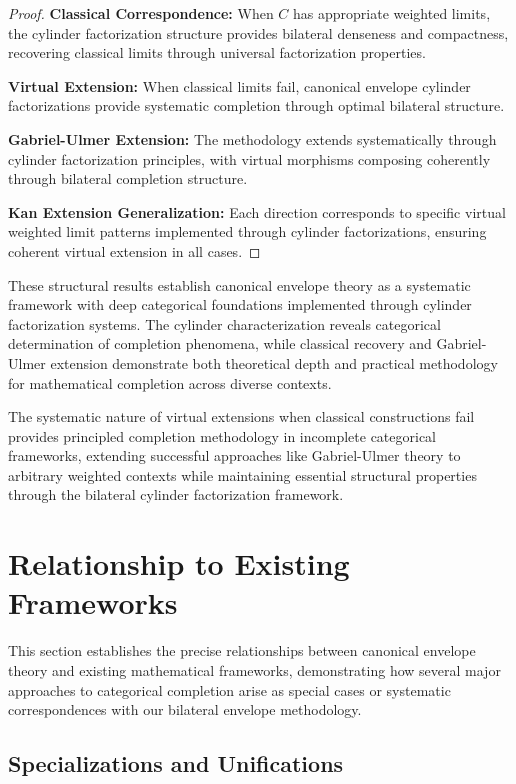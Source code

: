 \documentclass[11pt]{article}
\theoremstyle{plain}
\theoremstyle{definition}
\theoremstyle{remark}
\begin{document}
\begin{proof}
\textbf{Classical Correspondence:} When $C$ has appropriate weighted limits, the cylinder factorization structure provides bilateral denseness and compactness, recovering classical limits through universal factorization properties.

\textbf{Virtual Extension:} When classical limits fail, canonical envelope cylinder factorizations provide systematic completion through optimal bilateral structure.

\textbf{Gabriel-Ulmer Extension:} The methodology extends systematically through cylinder factorization principles, with virtual morphisms composing coherently through bilateral completion structure.

\textbf{Kan Extension Generalization:} Each direction corresponds to specific virtual weighted limit patterns implemented through cylinder factorizations, ensuring coherent virtual extension in all cases.
\end{proof}

These structural results establish canonical envelope theory as a systematic framework with deep categorical foundations implemented through cylinder factorization systems. The cylinder characterization reveals categorical determination of completion phenomena, while classical recovery and Gabriel-Ulmer extension demonstrate both theoretical depth and practical methodology for mathematical completion across diverse contexts.

The systematic nature of virtual extensions when classical constructions fail provides principled completion methodology in incomplete categorical frameworks, extending successful approaches like Gabriel-Ulmer theory to arbitrary weighted contexts while maintaining essential structural properties through the bilateral cylinder factorization framework.

\section{Relationship to Existing Frameworks}

This section establishes the precise relationships between canonical envelope theory and existing mathematical frameworks, demonstrating how several major approaches to categorical completion arise as special cases or systematic correspondences with our bilateral envelope methodology.

\subsection{Specializations and Unifications}
\end{document}
